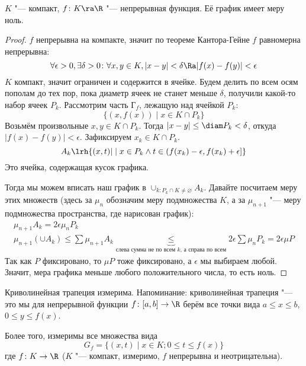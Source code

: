 \begin{theorem}
	$K$ "--- компакт, $f\colon K \ra \R$ "--- непрерывная функция.
	Её график имеет меру ноль.
\end{theorem}
\begin{proof}
	$f$ непрерывна на компакте, значит по теореме Кантора-Гейне $f$ равномерна непрерывна:
	\[ \forall \epsilon > 0, \exists \delta > 0\colon \forall x, y \in K, |x - y| < \delta \Ra |f(x) - f(y)| < \epsilon \]
	$K$ компакт, значит ограничен и содержится в ячейке.
	Будем делить по всем осям пополам до тех пор, пока диаметр ячеек не станет меньше $\delta$,
	получили какой-то набор ячеек $P_k$.
	Рассмотрим часть $Г_f$, лежащую над ячейкой $P_k$:
	\[ \{(x, f(x)) \mid x \in K \cap P_k \} \]
	Возьмём произвольные $x, y \in K \cap P_k$.
	Тогда $|x - y| \le \diam P_k < \delta$, откуда $|f(x) - f(y)| < \epsilon$.
	Зафиксируем $x_k \in K \cap P_k$.
	\[ A_k \lrh \{(x, t) | \mid x \in P_k \land t \in (f(x_k) - \epsilon, f(x_k) + \epsilon] \} \]
	Это ячейка, содержащая кусок графика.
	\begin{center}
	
	\end{center}
	Тогда мы можем вписать наш график в $\cup_{k \colon P_k \cap K \neq \varnothing} A_k$.
	Давайте посчитаем меру этих множеств (здесь за $\mu_n$ обозначим меру подмножества $K$, а за $\mu_{n+1}$ "--- меру подмножества пространства, где нарисован график):
	\begin{gather*}
	  \mu_{n+1} A_k = 2\epsilon \mu_n P_k \\
	  \mu_{n+1} (\cup A_k) \le \sum \mu_{n+1} A_k \underbrace{\le}_{\text{слева сумма не по всем $k$, а справа по всем}} 2\epsilon \sum \mu_n P_k = 2\epsilon \mu P
	\end{gather*}
	Так как $P$ фиксировано, то $\mu P$ тоже фиксировано, а $\epsilon$ мы выбираем любой.
	Значит, мера графика меньше любого положительного числа, то есть ноль.
\end{proof}
\begin{conseq}
	Криволинейная трапеция  измерима.
	Напоминание: криволинейная трапеция "--- это мы для непрерывной
	функции $f\colon [a, b] \to \R$ берём все точки вида $a \le x \le b$, $0 \le y \le f(x)$.
	\begin{center}
	
	\end{center}

	Более того, измеримы все множества вида
	\[ G_f = \{(x, t) \mid x \in K; 0 \le t \le f(x)\} \]
	где	$f \colon K \to \R$ ($K$ "--- компакт, измеримо, $f$ непрерывна и неотрицательна).
\end{conseq}
